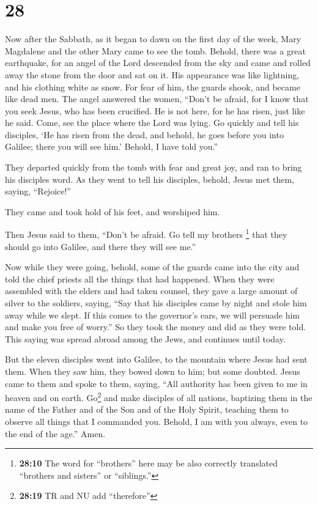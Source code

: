 \hypertarget{section-27}{%
\section{28}\label{section-27}}

 Now after the Sabbath, as it began to dawn on the first
day of the week, Mary Magdalene and the other Mary came to see the tomb.
 Behold, there was a great earthquake, for an angel of the
Lord descended from the sky and came and rolled away the stone from the
door and sat on it.  His appearance was like lightning,
and his clothing white as snow.  For fear of him, the
guards shook, and became like dead men.  The angel
answered the women, ``Don't be afraid, for I know that you seek Jesus,
who has been crucified.  He is not here, for he has risen,
just like he said. Come, see the place where the Lord was lying.
 Go quickly and tell his disciples, `He has risen from the
dead, and behold, he goes before you into Galilee; there you will see
him.' Behold, I have told you.''

 They departed quickly from the tomb with fear and great
joy, and ran to bring his disciples word.  As they went to
tell his disciples, behold, Jesus met them, saying, ``Rejoice!''

They came and took hold of his feet, and worshiped him.

 Then Jesus said to them, ``Don't be afraid. Go tell my
brothers \footnote{\textbf{28:10} The word for ``brothers'' here may be
  also correctly translated ``brothers and sisters'' or ``siblings.''}
that they should go into Galilee, and there they will see me.''

 Now while they were going, behold, some of the guards
came into the city and told the chief priests all the things that had
happened.  When they were assembled with the elders and
had taken counsel, they gave a large amount of silver to the soldiers,
 saying, ``Say that his disciples came by night and stole
him away while we slept.  If this comes to the governor's
ears, we will persuade him and make you free of worry.'' 
So they took the money and did as they were told. This saying was spread
abroad among the Jews, and continues until today.

 But the eleven disciples went into Galilee, to the
mountain where Jesus had sent them.  When they saw him,
they bowed down to him; but some doubted.  Jesus came to
them and spoke to them, saying, ``All authority has been given to me in
heaven and on earth.  Go\footnote{\textbf{28:19} TR and
  NU add ``therefore''} and make disciples of all nations, baptizing
them in the name of the Father and of the Son and of the Holy Spirit,
 teaching them to observe all things that I commanded
you. Behold, I am with you always, even to the end of the age.'' Amen.
